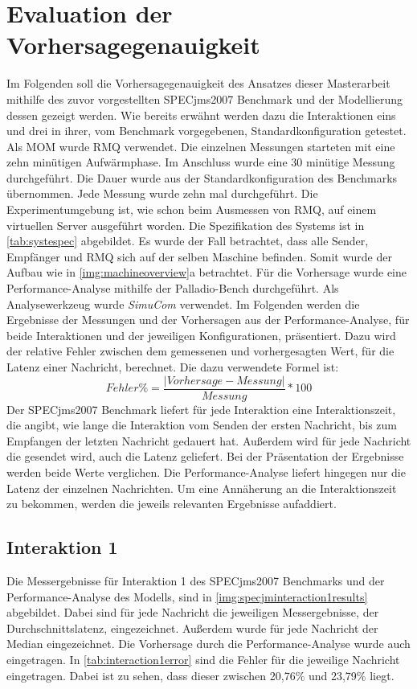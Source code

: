 \section{Evaluation der Vorhersagegenauigkeit}
\label{sec:specjmsmodellvorhersage}
Im Folgenden soll die Vorhersagegenauigkeit des Ansatzes dieser Masterarbeit mithilfe des zuvor vorgestellten SPECjms2007 Benchmark und der Modellierung dessen gezeigt werden. Wie bereits erwähnt werden dazu die Interaktionen eins und drei in ihrer, vom Benchmark vorgegebenen, Standardkonfiguration getestet. Als MOM wurde RMQ verwendet. Die einzelnen Messungen starteten mit eine zehn minütigen Aufwärmphase. Im Anschluss wurde eine 30 minütige Messung durchgeführt. Die Dauer wurde aus der Standardkonfiguration des Benchmarks übernommen. Jede Messung wurde zehn mal durchgeführt. Die Experimentumgebung ist, wie schon beim Ausmessen von RMQ, auf einem virtuellen Server ausgeführt worden. Die Spezifikation des Systems ist in \autoref{tab:systespec} abgebildet. Es wurde der Fall betrachtet, dass alle Sender, Empfänger und RMQ sich auf der selben Maschine befinden. Somit wurde der Aufbau wie in \autoref{img:machineoverview}a betrachtet. Für die Vorhersage wurde eine Performance-Analyse mithilfe der Palladio-Bench durchgeführt. Als Analysewerkzeug wurde \emph{SimuCom} verwendet. Im Folgenden werden die Ergebnisse der Messungen und der Vorhersagen aus der Performance-Analyse, für beide Interaktionen und der jeweiligen Konfigurationen, präsentiert. Dazu wird der relative Fehler zwischen dem gemessenen und vorhergesagten Wert, für die Latenz einer Nachricht, berechnet. Die dazu verwendete Formel ist:
\[ Fehler\% = \frac{|Vorhersage - Messung|}{Messung} * 100 \]
Der SPECjms2007 Benchmark liefert für jede Interaktion eine Interaktionszeit, die angibt, wie lange die Interaktion vom Senden der ersten Nachricht, bis zum Empfangen der letzten Nachricht gedauert hat. Außerdem wird für jede Nachricht die gesendet wird, auch die Latenz geliefert. Bei der Präsentation der Ergebnisse werden beide Werte verglichen. Die Performance-Analyse liefert hingegen nur die Latenz der einzelnen Nachrichten. Um eine Annäherung an die Interaktionszeit zu bekommen, werden die jeweils relevanten Ergebnisse aufaddiert.
\subsection{Interaktion 1}
Die Messergebnisse für Interaktion 1 des SPECjms2007 Benchmarks und der Performance-Analyse des Modells, sind in \autoref{img:specjminteraction1results} abgebildet. Dabei sind für jede Nachricht die jeweiligen Messergebnisse, der Durchschnittslatenz, eingezeichnet. Außerdem wurde für jede Nachricht der Median eingezeichnet. Die Vorhersage durch die Performance-Analyse wurde auch eingetragen. In \autoref{tab:interaction1error} sind die Fehler für die jeweilige Nachricht eingetragen. Dabei ist zu sehen, dass dieser zwischen 20,76\% und 23,79\% liegt. 

